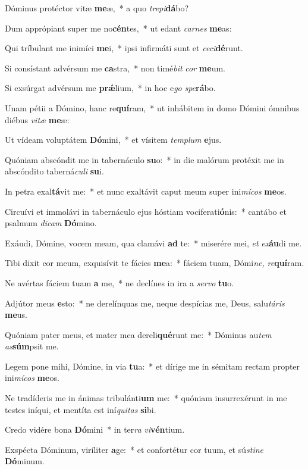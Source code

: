 \item Dóminus protéctor vitæ \textbf{me}æ,~* a quo \textit{trepi}\textbf{dá}bo?
\item Dum apprópiant super me no\textbf{cén}tes,~* ut edant \textit{carnes} \textbf{me}as:
\item Qui tríbulant me inimíci \textbf{me}i,~* ipsi infirmáti sunt et \textit{ceci}\textbf{dé}runt.
\item Si consístant advérsum me \textbf{ca}stra,~* non timé\textit{bit} \textit{cor} \textbf{me}um.
\item Si exsúrgat advérsum me \textbf{prǽ}lium,~* in hoc e\textit{go} \textit{spe}\textbf{rá}bo.
\item Unam pétii a Dómino, hanc re\textbf{quí}ram,~* ut inhábitem in domo Dómini ómnibus diébus \textit{vitæ} \textbf{me}æ:
\item Ut vídeam voluptátem \textbf{Dó}mini,~* et vísitem \textit{templum} \textbf{e}jus.
\item Quóniam abscóndit me in tabernáculo \textbf{su}o:~* in die malórum protéxit me in abscóndito taberná\textit{culi} \textbf{su}i.
\item In petra exal\textbf{tá}vit me:~* et nunc exaltávit caput meum super ini\textit{mícos} \textbf{me}os.
\item Circuívi et immolávi in tabernáculo ejus hóstiam vociferati\textbf{ó}nis:~* cantábo et psalmum \textit{dicam} \textbf{Dó}mino.
\item Exáudi, Dómine, vocem meam, qua clamávi \textbf{ad} te:~* miserére mei, \textit{et} \textit{ex}\textbf{áu}di me.
\item Tibi dixit cor meum, exquisívit te fácies \textbf{me}a:~* fáciem tuam, Dómi\textit{ne,} \textit{re}\textbf{quí}ram.
\item Ne avértas fáciem tuam \textbf{a} me,~* ne declínes in ira a \textit{servo} \textbf{tu}o.
\item Adjútor meus \textbf{e}sto:~* ne derelínquas me, neque despícias me, Deus, salu\hspace{0.03em}\textit{táris} \textbf{me}us.
\item Quóniam pater meus, et mater mea dereli\textbf{qué}runt me:~* Dóminus au\hspace{0.03em}\textit{tem} \textit{as}\textbf{súm}psit me.
\item Legem pone mihi, Dómine, in via \textbf{tu}a:~* et dírige me in sémitam rectam propter ini\textit{mícos} \textbf{me}os.
\item Ne tradíderis me in ánimas tribulánti\textbf{um} me:~* quóniam insurrexérunt in me testes iníqui, et mentíta est iní\hspace{0.03em}\textit{quitas} \textbf{si}bi.
\item Credo vidére bona \textbf{Dó}mini~* in ter\textit{ra} \textit{vi}\textbf{vén}tium.
\item Exspécta Dóminum, viríliter \textbf{a}ge:~* et confortétur cor tuum, et sú\spurhspace\textit{stine} \textbf{Dó}minum.
